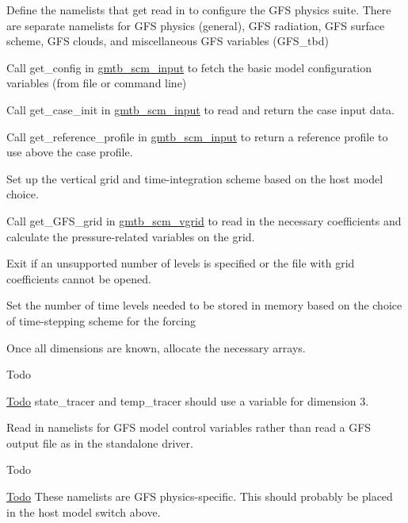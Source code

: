 \begin{DoxyItemize}
\item Define the namelists that get read in to configure the G\+FS physics suite. There are separate namelists for G\+FS physics (general), G\+FS radiation, G\+FS surface scheme, G\+FS clouds, and miscellaneous G\+FS variables (G\+F\+S\+\_\+tbd)
\item Call get\+\_\+config in \hyperlink{group__input}{gmtb\+\_\+scm\+\_\+input} to fetch the basic model configuration variables (from file or command line)
\item Call get\+\_\+case\+\_\+init in \hyperlink{group__input}{gmtb\+\_\+scm\+\_\+input} to read and return the case input data.
\item Call get\+\_\+reference\+\_\+profile in \hyperlink{group__input}{gmtb\+\_\+scm\+\_\+input} to return a reference profile to use above the case profile.
\item Set up the vertical grid and time-\/integration scheme based on the host model choice.
\begin{DoxyItemize}
\item Call get\+\_\+\+G\+F\+S\+\_\+grid in \hyperlink{group__vgrid}{gmtb\+\_\+scm\+\_\+vgrid} to read in the necessary coefficients and calculate the pressure-\/related variables on the grid.
\item Exit if an unsupported number of levels is specified or the file with grid coefficients cannot be opened.
\item Set the number of time levels needed to be stored in memory based on the choice of time-\/stepping scheme for the forcing
\end{DoxyItemize}
\item Once all dimensions are known, allocate the necessary arrays.
\item \begin{DoxyRefDesc}{Todo}
\item[\hyperlink{todo__todo000001}{Todo}]state\+\_\+tracer and temp\+\_\+tracer should use a variable for dimension 3. \end{DoxyRefDesc}

\item Read in namelists for G\+FS model control variables rather than read a G\+FS output file as in the standalone driver.
\item \begin{DoxyRefDesc}{Todo}
\item[\hyperlink{todo__todo000002}{Todo}]These namelists are G\+FS physics-\/specific. This should probably be placed in the host model switch above. \end{DoxyRefDesc}


\end{DoxyItemize}

